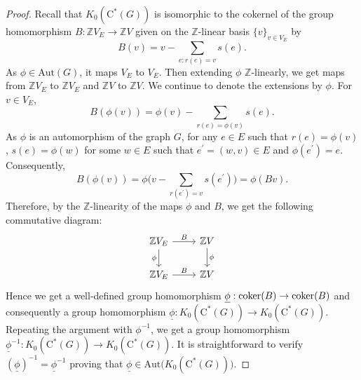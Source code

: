 \documentclass[a4paper,11pt,reqno]{amsart}
\theoremstyle{plain}
\theoremstyle{named}
\numberwithin{equation}{section}
\begin{document}
            \begin{proof}
            Recall that $K_{0}(\textrm{C}^{\ast}(G))$ is isomorphic to the cokernel of the group homomorphism $B:\mathbb{Z}V_{E}\rightarrow\mathbb{Z}V$ given on the $\mathbb{Z}$-linear basis $\{v\}_{v\in V_{E}}$ by
            \begin{displaymath}
                B(v)=v-\sum_{e:r(e)=v}s(e).
            \end{displaymath}
            As $\phi\in\textrm {Aut}(G)$, it maps $V_{E}$ to $V_{E}$. Then extending $\phi$ $\mathbb{Z}$-linearly, we get maps from $\mathbb{Z}V_{E}$ to $\mathbb{Z}V_{E}$ and $\mathbb{Z}V$ to $\mathbb{Z}V$. We continue to denote the extensions by $\phi$. For $v\in V_{E}$,
            \begin{displaymath}
                B(\phi(v))=\phi(v)-\sum_{r(e)=\phi(v)}s(e).
            \end{displaymath}
            As $\phi$ is an automorphism of the graph $G$, for any $e\in E$ such that $r(e)=\phi(v)$, $s(e)=\phi(w)$ for some $w\in E$ such that $e^{\prime}=(w,v)\in E$ and  $\phi(e^{\prime})=e$. Consequently, 
            \begin{displaymath}
                B(\phi(v))=\phi\Big(v-\sum_{r(e^{\prime})=v}s(e^{\prime})\Big)=\phi(Bv).
            \end{displaymath}
            Therefore, by the $\mathbb{Z}$-linearity of the maps $\phi$ and $B$, we get the following commutative diagram:
            \[
\begin{tikzcd}
\mathbb{Z}V_{E} \arrow{r}{B} \arrow[swap]{d}{\phi} & \mathbb{Z}V \arrow{d}{\phi} \\
\mathbb{Z}V_{E} \arrow{r}{B} & \mathbb{Z}V
\end{tikzcd}
\]
Hence we get a well-defined group homomorphism $\underline{\phi}:{\rm coker}(B)\rightarrow {\rm coker}(B)$ and consequently a group homomorphism $\underline{\phi}:K_{0}(\textrm{C}^{\ast}(G))\rightarrow K_{0}(\textrm{C}^{\ast}(G))$. Repeating the argument with $\phi^{-1}$, we get a group homomorphism $\underline{\phi}^{-1}:K_{0}(\textrm{C}^{\ast}(G))\rightarrow K_{0}(\textrm{C}^{\ast}(G))$. It is straightforward to verify $(\underline{\phi})^{-1}=\underline{\phi}^{-1}$ proving that $\underline{\phi}\in\textrm {Aut}\Big(K_{0}(\textrm{C}^{\ast}(G))\Big)$.
            \end{proof}
            
\end{document}
